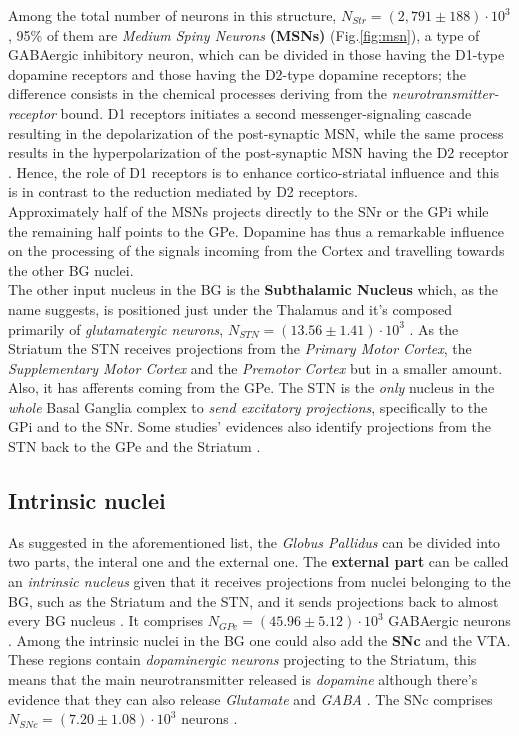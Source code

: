 \documentclass[MSc,english]{Container/thesistemplate}
\begin{document}
Among the total number of neurons in this structure, $N_{Str}=(2,791\pm 188)\cdot 10^3$ \cite{oorschot}, 95\% of them are \emph{Medium Spiny Neurons} \textbf{(MSNs)} (Fig.\ref{fig:msn}), a type of GABAergic inhibitory neuron, which can be divided in those having the D1-type dopamine receptors and those having the D2-type dopamine receptors; the difference consists in the chemical processes deriving from the \emph{neurotransmitter-receptor} bound. D1 receptors initiates a second messenger-signaling cascade resulting in the depolarization of the post-synaptic MSN, while the same process results in the hyperpolarization of the post-synaptic MSN having the D2 receptor \cite{utterbasso}. Hence, the role of D1 receptors is to enhance cortico-striatal influence and this is in contrast to the reduction mediated by D2 receptors.
\\ Approximately half of the MSNs projects directly to the SNr or the GPi while the remaining half points to the GPe. Dopamine has thus a remarkable influence on the processing of the signals incoming from the Cortex and travelling towards the other BG nuclei.
\\ The other input nucleus in the BG is the \textbf{Subthalamic Nucleus} which, as the name suggests, is positioned just under the Thalamus and it's composed primarily of \emph{glutamatergic neurons}, $N_{STN} = (13.56\pm 1.41)\cdot 10^3$ \cite{oorschot}. As the Striatum the STN receives projections from the \emph{Primary Motor Cortex}, the \emph{Supplementary Motor Cortex} and the \emph{Premotor Cortex} but in a smaller amount. Also, it has afferents coming from the GPe. The STN is the \emph{only} nucleus in the \emph{whole} Basal Ganglia complex to \emph{send excitatory projections}, specifically to the GPi and to the SNr. Some studies' evidences also identify projections from the STN back to the GPe and the Striatum \cite{nelsonkreitzer}.

\subsection*{Intrinsic nuclei}
As suggested in the aforementioned list, the \emph{Globus Pallidus} can be divided into two parts, the interal one and the external one. The \textbf{external part} can be called an \emph{intrinsic nucleus} given that it receives projections from nuclei belonging to the BG, such as the Striatum and the STN, and it sends projections back to almost every BG nucleus \cite{nelsonkreitzer}. It comprises $N_{GPe} = (45.96 \pm 5.12)\cdot 10^3$ GABAergic neurons \cite{oorschot}. Among the intrinsic nuclei in the BG one could also add the \textbf{SNc} and the VTA. These regions contain \emph{dopaminergic neurons} projecting to the Striatum, this means that the main neurotransmitter released is \emph{dopamine} although there's evidence that they can also release \emph{Glutamate} and \emph{GABA} \cite{nelsonkreitzer}. The SNc comprises $N_{SNc} = (7.20 \pm 1.08) \cdot 10^3$ neurons \cite{oorschot}.
\end{document}
